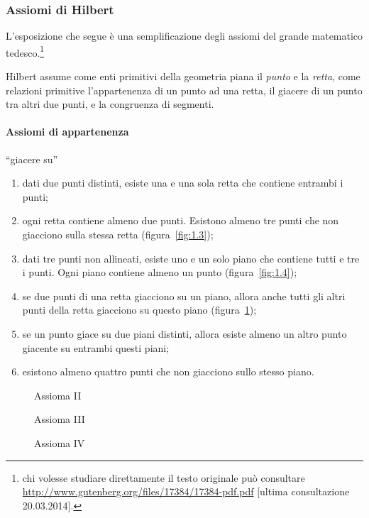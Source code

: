 \subsubsection*{Assiomi di Hilbert}

L'esposizione che segue è una semplificazione degli assiomi del grande matematico tedesco.\footnote{chi volesse studiare direttamente il testo originale può consultare \url{http://www.gutenberg.org/files/17384/17384-pdf.pdf} [ultima consultazione 20.03.2014].}

Hilbert assume come enti primitivi della geometria piana il \emph{punto} e la \emph{retta}, come relazioni primitive l'appartenenza di un punto ad una retta, il giacere di un punto tra altri due punti, e la congruenza di segmenti.

\paragraph{Assiomi di appartenenza} ``giacere su''
\begin{enumerate}[label=\Roman{*}.]
\item dati due punti distinti, esiste una e una sola retta che contiene entrambi i punti;
\item ogni retta contiene almeno due punti. Esistono almeno tre punti che non giacciono sulla stessa retta (figura~\ref{fig:1.3});
\item dati tre punti non allineati, esiste uno e un solo piano che contiene tutti e tre i punti. Ogni piano contiene almeno un punto (figura~\ref{fig:1.4});
\item se due punti di una retta giacciono su un piano, allora anche tutti gli altri punti della retta giacciono su questo piano (figura~\ref{fig:1.5});
\item se un punto giace su due piani distinti, allora esiste almeno un altro punto giacente su entrambi questi piani;
\item esistono almeno quattro punti che non giacciono sullo stesso piano.
\end{enumerate}

\begin{figure}[b,t,h]
 \begin{minipage}[b]{.32\textwidth}
 \centering
 
 \caption{Assioma II}\label{fig:1.3}
 \end{minipage}
 \begin{minipage}[b]{.32\textwidth}
 \centering
 
 \caption{Assioma III}\label{fig:1.4}
 \end{minipage}
 \begin{minipage}[b]{.32\textwidth}
 \centering
 
 \caption{Assioma IV}\label{fig:1.5}
 \end{minipage}
\end{figure}

